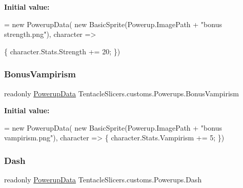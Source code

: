 {\bfseries Initial value\+:}
\begin{DoxyCode}
= \textcolor{keyword}{new} PowerupData(
            \textcolor{keyword}{new} BasicSprite(Powerup.ImagePath + \textcolor{stringliteral}{"bonus strength.png"}), character =>

            \{
                character.Stats.Strength += 20;
            \})
\end{DoxyCode}
\mbox{\label{class_tentacle_slicers_1_1customs_1_1_powerups_a3b6b1b567f231807891cfa5c6b2920d0}} 
\subsubsection{\texorpdfstring{Bonus\+Vampirism}{BonusVampirism}}
{\footnotesize\ttfamily readonly \hyperlink{class_tentacle_slicers_1_1actors_1_1_powerup_data}{Powerup\+Data} Tentacle\+Slicers.\+customs.\+Powerups.\+Bonus\+Vampirism\hspace{0.3cm}{\ttfamily [static]}}

{\bfseries Initial value\+:}
\begin{DoxyCode}
= \textcolor{keyword}{new} PowerupData(
            \textcolor{keyword}{new} BasicSprite(Powerup.ImagePath + \textcolor{stringliteral}{"bonus vampirism.png"}), character =>
            \{
                character.Stats.Vampirism += 5;
            \})
\end{DoxyCode}
\mbox{\label{class_tentacle_slicers_1_1customs_1_1_powerups_ae1b391dbe072212fb301e87005d55f48}} 
\subsubsection{\texorpdfstring{Dash}{Dash}}
{\footnotesize\ttfamily readonly \hyperlink{class_tentacle_slicers_1_1actors_1_1_powerup_data}{Powerup\+Data} Tentacle\+Slicers.\+customs.\+Powerups.\+Dash\hspace{0.3cm}{\ttfamily [static]}}

